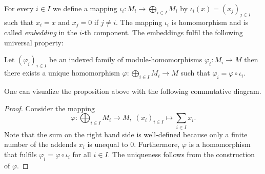 For every $i\in I$ we define a mapping $\iota_i\colon M_i\to \bigoplus_{i\in I}M_i$ by $\iota_i(x)=(x_j)_{j\in I}$ such that $x_i=x$ and $x_j=0$ if $j\neq i$. The mapping $\iota_i$ is homomorphism and is called \textit{embedding} in the $i$-th component. The embeddings fulfil the following universal property:

\begin{pro}\label{prop.UniversalPropertyDirectSum}
Let $(\varphi_i)_{i\in I}$ be an indexed family of module-homomorphisms $\varphi_i\colon M_i\to M$  then there exists a unique homomorphism $\varphi\colon\bigoplus_{i\in I}M_i\to M$ such that $\varphi_i=\varphi\circ\iota_i$.
\end{pro}

One can visualize the proposition above with the following commutative diagram.
\begin{center}
\end{center}


\begin{proof}
Consider the mapping 
\[\varphi\colon\bigoplus_{i\in I}M_i\to M, \; (x_i)_{i\in I}\mapsto\sum_{i\in I}x_i.\]
Note that the sum on the right hand side is well-defined because only a finite number of the addends $x_i$ is unequal to $0$. Furthermore, $\varphi$ is a homomorphism that fulfils $\varphi_i=\varphi\circ\iota_i$ for all $i\in I$. The uniqueness follows from the construction of $\varphi$.
\end{proof}

%
